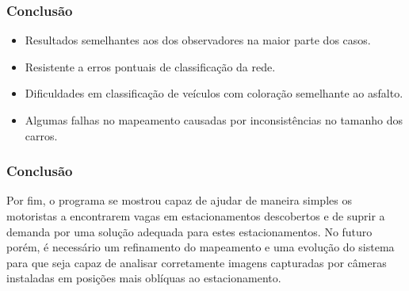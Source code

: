 \documentclass{beamer}
\begin{document}
%

\begin{frame}
	\frametitle{Conclusão}
	\begin{itemize}
		\item Resultados semelhantes aos dos observadores na maior parte dos casos.
		\item Resistente a erros pontuais de classificação da rede.
		\item Dificuldades em classificação de veículos com coloração semelhante ao asfalto.
		\item Algumas falhas no mapeamento causadas por inconsistências no tamanho dos carros.
	\end{itemize}
\end{frame}

\begin{frame}
	\frametitle{Conclusão}
	\begin{block}{}
		Por fim, o programa se mostrou capaz de ajudar de maneira simples os motoristas a encontrarem vagas em estacionamentos descobertos e de suprir a demanda por uma solução adequada para estes estacionamentos. No futuro porém, é necessário um refinamento do mapeamento e uma evolução do sistema para que seja capaz de analisar corretamente imagens capturadas por câmeras instaladas em posições mais oblíquas ao estacionamento.
	\end{block}
\end{frame}
\end{document}
